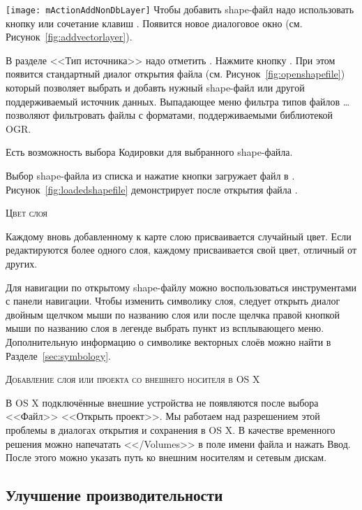 \texttt{[image: mActionAddNonDbLayer]} Чтобы добавить shape-файл
надо использовать кнопку 
 или сочетание клавиш .
Появится новое диалоговое окно (см. Рисунок~\ref{fig:addvectorlayer}).

В разделе <<Тип источника>> надо отметить . Нажмите
кнопку . При этом появится стандартный диалог открытия файла
(см. Рисунок~\ref{fig:openshapefile}) который позволяет выбрать и добавть
нужный shape-файл или другой поддерживаемый источник данных. Выпадающее меню
фильтра типов файлов \ldots позволяют фильтровать файлы с форматами,
поддерживаемыми библиотекой OGR.

Есть возможность выбора Кодировки для выбранного shape-файла.

Выбор shape-файла из списка и нажатие кнопки  загружает
файл в \qg. Рисунок~\ref{fig:loadedshapefile} демонстрирует \qg после
открытия файла .


\begin{Tip}\caption{\textsc{Цвет слоя}}
Каждому вновь добавленному к карте слою присваивается случайный цвет.
Если редактируются более одного слоя, каждому присваивается свой цвет,
отличный от других.
\end{Tip}

Для навигации по открытому shape-файлу можно воспользоваться инструментами
с панели навигации. Чтобы изменить символику слоя, следует открыть диалог
 двойным щелчком мыши по названию слоя или после
щелчка правой кнопкой мыши по названию слоя в легенде выбрать пункт
 из всплывающего меню. Дополнительную информацию
о символике векторных слоёв можно найти в Разделе~\ref{sec:symbology}.

\begin{Tip}\caption{\textsc{Добавление слоя или проекта со внешнего носителя в OS X}}
В OS X подключённые внешние устройства не появляются после выбора <<Файл>> \arrow
<<Открыть проект>>. Мы работаем над разрешением этой проблемы в диалогах
открытия и сохранения в OS X. В качестве временного решения можно напечатать
<</Volumes>> в поле имени файла и нажать Ввод. После этого можно указать путь
ко внешним носителям и сетевым дискам.
\end{Tip}

\subsection{Улучшение производительности}


